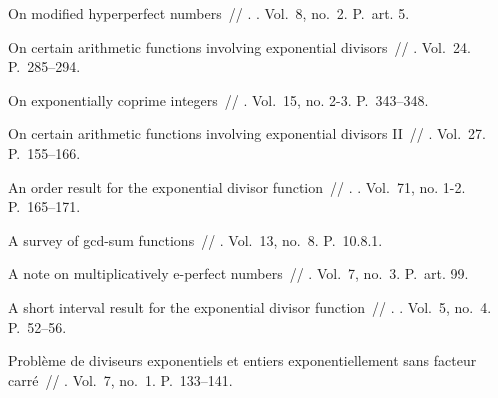 \documentclass{article}
\begin{document}
\begin{thebibliography}{10}
 On modified hyperperfect numbers~//
  . \BibDash
{}. \BibDash
\newblock Vol.~8, no.~2. \BibDash
\newblock P.~art. 5.

 On certain arithmetic functions involving exponential
  divisors~// 
  \BibDash
{}. \BibDash
\newblock Vol.~24. \BibDash
\newblock P.~285--294.

 On exponentially coprime integers~//  \BibDash
{}. \BibDash
\newblock Vol.~15, no. 2-3. \BibDash
\newblock P.~343--348.

 On certain arithmetic functions involving exponential
  divisors II~//  \BibDash
{}. \BibDash
\newblock Vol.~27. \BibDash
\newblock P.~155--166.

 An order result for the exponential divisor function~//
  . \BibDash
{}. \BibDash
\newblock Vol.~71, no. 1-2. \BibDash
\newblock P.~165--171.

 A survey of gcd-sum functions~// 
  \BibDash
{}. \BibDash
\newblock Vol.~13, no.~8. \BibDash
\newblock P.~10.8.1.

 A note on multiplicatively e-perfect
  numbers~//  \BibDash
{}. \BibDash
\newblock Vol.~7, no.~3. \BibDash
\newblock P.~art. 99.

 A short interval result for the exponential divisor
  function~// . \BibDash
{}. \BibDash
\newblock Vol.~5, no.~4. \BibDash
\newblock P.~52--56.

 Problème de diviseurs exponentiels et entiers
  exponentiellement sans facteur carré~//
  \href{http://dx.doi.org/10.5802/jtnb.136}{} \BibDash
{}. \BibDash
\newblock Vol.~7, no.~1. \BibDash
\newblock P.~133--141.


\end{thebibliography}
\end{document}
